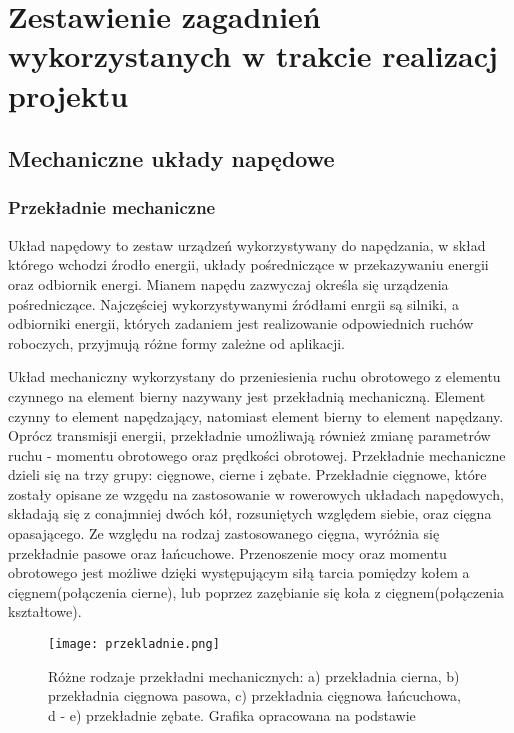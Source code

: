 \chapter{Zestawienie zagadnień wykorzystanych w trakcie realizacj projektu}
\label{cha:Zestawienie zagadnień wykorzystanych w pracy}

\section{Mechaniczne układy napędowe}
\subsection{Przekładnie mechaniczne}
Układ napędowy to zestaw urządzeń wykorzystywany do napędzania, w skład którego wchodzi źrodło energii, układy pośredniczące w przekazywaniu energii oraz odbiornik energi. Mianem napędu zazwyczaj określa się urządzenia pośredniczące. Najczęściej wykorzystywanymi źródłami enrgii są silniki, a odbiorniki energii, których zadaniem jest realizowanie odpowiednich ruchów roboczych, przyjmują różne formy zależne od aplikacji.

Układ mechaniczny wykorzystany do przeniesienia ruchu obrotowego z elementu czynnego na element bierny nazywany jest przekładnią mechaniczną. Element czynny to element napędzający, natomiast element bierny to element napędzany. Oprócz transmisji energii, przekładnie umożliwają również zmianę parametrów ruchu - momentu obrotowego oraz prędkości obrotowej. Przekładnie mechaniczne dzieli się na trzy grupy: cięgnowe, cierne i zębate. Przekładnie cięgnowe, które zostały opisane ze wzgędu na zastosowanie w rowerowych układach napędowych, składają się z conajmniej dwóch kół, rozsuniętych względem siebie, oraz cięgna opasającego. Ze względu na rodzaj zastosowanego cięgna, wyróżnia się przekładnie pasowe oraz łańcuchowe. Przenoszenie mocy oraz momentu obrotowego jest możliwe dzięki występującym siłą tarcia pomiędzy kołem a cięgnem(połączenia cierne), lub poprzez zazębianie się koła z cięgnem(połączenia kształtowe).
\begin{figure}[h]
    \centering
    \texttt{[image: przekladnie.png]}
    \caption{Różne rodzaje przekładni mechanicznych: a) przekładnia cierna, b) przekładnia cięgnowa pasowa, c) przekładnia cięgnowa łańcuchowa, d - e) przekładnie zębate. Grafika opracowana na podstawie \cite{maszyny1}}
    \label{fig:przekladnia}
\end{figure}

